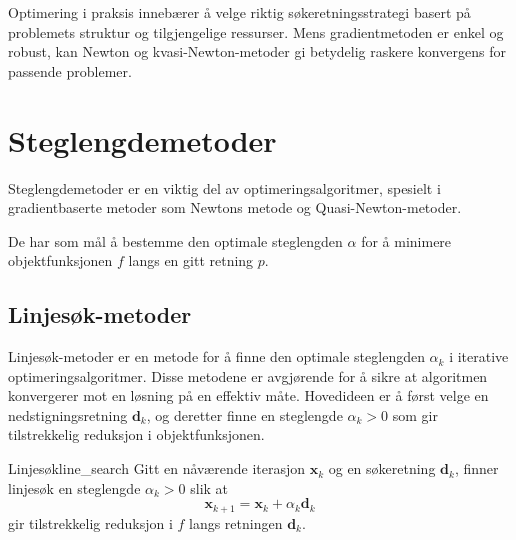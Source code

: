Optimering i praksis innebærer å velge riktig søkeretningsstrategi basert på problemets struktur og tilgjengelige ressurser. Mens gradientmetoden er enkel og robust, kan Newton og kvasi-Newton-metoder gi betydelig raskere konvergens for passende problemer.

\chapter{Steglengdemetoder}
\label{chap:step_length_methods}
Steglengdemetoder er en viktig del av optimeringsalgoritmer, spesielt i gradientbaserte metoder som Newtons metode og Quasi-Newton-metoder.

De har som mål å bestemme den optimale steglengden \(\alpha\) for å minimere objektfunksjonen \(f\) langs en gitt retning \(p\).

\section{Linjesøk-metoder}
\label{sec:line_search_methods}

Linjesøk-metoder er en metode for å finne den optimale steglengden \(\alpha_k\) i iterative optimeringsalgoritmer.
Disse metodene er avgjørende for å sikre at algoritmen konvergerer mot en løsning på en effektiv måte.
Hovedideen er å først velge en nedstigningsretning \(\symbf{d}_k\), og deretter finne en steglengde \(\alpha_k > 0\) som gir tilstrekkelig reduksjon i objektfunksjonen.

\begin{definition}{Linjesøk}{line_search}
	Gitt en nåværende iterasjon \(\symbf{x}_k\) og en søkeretning \(\symbf{d}_k\), finner linjesøk en steglengde \(\alpha_k > 0\) slik at
	\[
		\symbf{x}_{k+1} = \symbf{x}_k + \alpha_k \symbf{d}_k
	\]
	gir tilstrekkelig reduksjon i \(f\) langs retningen \(\symbf{d}_k\).
\end{definition}

